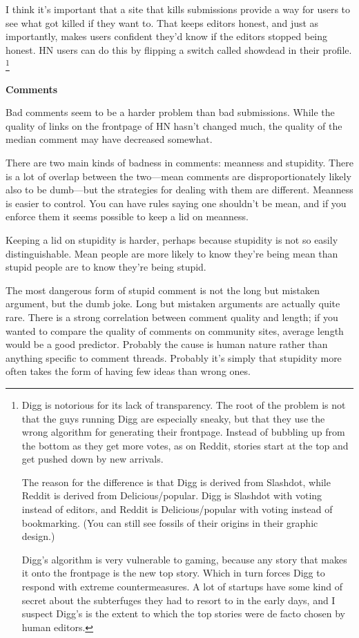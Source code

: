 \documentclass[12pt]{book}
\begin{document}
I think it's important that a site that kills submissions provide a way
for users to see what got killed if they want to. That keeps editors
honest, and just as importantly, makes users confident they'd know if
the editors stopped being honest. HN users can do this by flipping a
switch called showdead in their profile. \footnote{Digg is notorious for its lack of transparency. The root of the
problem is not that the guys running Digg are especially sneaky, but
that they use the wrong algorithm for generating their frontpage.
Instead of bubbling up from the bottom as they get more votes, as on
Reddit, stories start at the top and get pushed down by new arrivals.

The reason for the difference is that Digg is derived from Slashdot,
while Reddit is derived from Delicious/popular. Digg is Slashdot with
voting instead of editors, and Reddit is Delicious/popular with voting
instead of bookmarking. (You can still see fossils of their origins in
their graphic design.)

Digg's algorithm is very vulnerable to gaming, because any story that
makes it onto the frontpage is the new top story. Which in turn forces
Digg to respond with extreme countermeasures. A lot of startups have
some kind of secret about the subterfuges they had to resort to in the
early days, and I suspect Digg's is the extent to which the top stories
were de facto chosen by human editors.}

\textbf{Comments}

Bad comments seem to be a harder problem than bad submissions. While the
quality of links on the frontpage of HN hasn't changed much, the quality
of the median comment may have decreased somewhat.

There are two main kinds of badness in comments: meanness and stupidity.
There is a lot of overlap between the two---mean comments are
disproportionately likely also to be dumb---but the strategies for
dealing with them are different. Meanness is easier to control. You can
have rules saying one shouldn't be mean, and if you enforce them it
seems possible to keep a lid on meanness.

Keeping a lid on stupidity is harder, perhaps because stupidity is not
so easily distinguishable. Mean people are more likely to know they're
being mean than stupid people are to know they're being stupid.

The most dangerous form of stupid comment is not the long but mistaken
argument, but the dumb joke. Long but mistaken arguments are actually
quite rare. There is a strong correlation between comment quality and
length; if you wanted to compare the quality of comments on community
sites, average length would be a good predictor. Probably the cause is
human nature rather than anything specific to comment threads. Probably
it's simply that stupidity more often takes the form of having few ideas
than wrong ones.
\end{document}

